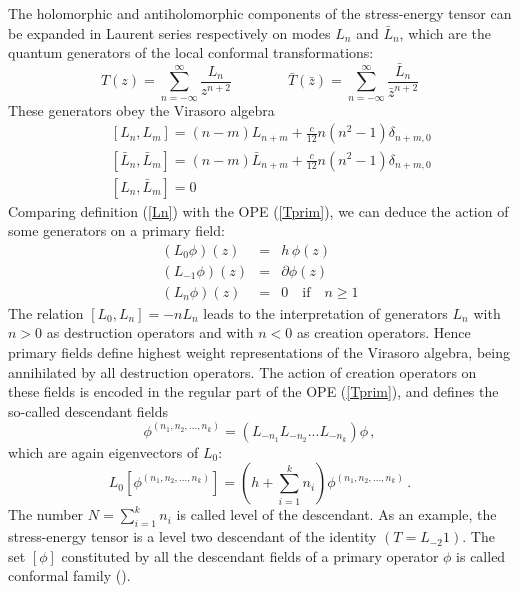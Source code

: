 \documentclass[a4paper,12pt]{report}
\begin{document}
The holomorphic and antiholomorphic components of the stress-energy tensor can be expanded in Laurent series
respectively on modes $L_{n}$ and $\bar{L}_{n}$, which are the quantum generators of the local conformal
transformations:
\begin{equation}\label{Ln}
T(z)=\sum_{n=-\infty}^{\infty}\frac{L_{n}}{z^{n+2}}\qquad\qquad
\bar{T}(\bar{z})=\sum_{n=-\infty}^{\infty}\frac{\bar{L}_{n}}{\bar{z}^{n+2}}
\end{equation}
These generators obey the Virasoro algebra
\begin{eqnarray}\label{vir}
&& [L_{n},L_{m}]=(n-m)L_{n+m}+\frac{c}{12}n(n^{2}-1)\delta_{n+m,0}\\
&& [\bar{L}_{n},\bar{L}_{m}]=(n-m)\bar{L}_{n+m}+\frac{c}{12}n(n^{2}-1)\delta_{n+m,0}\\
&& [L_{n},\bar{L}_{m}]=0
\end{eqnarray}
Comparing definition (\ref{Ln}) with the OPE (\ref{Tprim}), we can deduce the action of some generators on a
primary field:
\begin{eqnarray}\label{Lprim}
\left(L_{0}\phi\right)(z)&=&h\,\phi(z)\\
\left(L_{-1}\phi\right)(z)&=&\partial\phi(z)\\
\left(L_{n}\phi\right)(z)&=&0\quad\textrm{if}\quad n\geq 1
\end{eqnarray}
The relation $[L_{0},L_{n}]=-nL_{n}$ leads to the interpretation of generators $L_{n}$ with $n>0$ as destruction
operators and with $n<0$ as creation operators. Hence primary fields define highest weight representations of the
Virasoro algebra, being annihilated by all destruction operators. The action of creation operators on these
fields is encoded in the regular part of the OPE (\ref{Tprim}), and defines the so-called descendant fields
\begin{equation}\label{desc}
\phi^{(n_{1},n_{2},...,n_{k})}=\left(L_{-n_{1}}L_{-n_{2}}...L_{-n_{k}}\right)\phi \,,
\end{equation}
which are again eigenvectors of $L_{0}$:
\begin{equation}\label{hdesc}
L_{0}\left[\phi^{(n_{1},n_{2},...,n_{k})}\right]=\left(h+\sum_{i=1}^{k}n_{i}\right)\phi^{(n_{1},n_{2},...,n_{k})}\,.
\end{equation}
The number $N=\sum_{i=1}^{k}n_{i}$ is called level of the descendant. As an example, the stress-energy tensor is
a level two descendant of the identity $(T=L_{-2}1)$. The set $[\phi]$ constituted by all the descendant fields
of a primary operator $\phi$ is called conformal family (\cite{bpz}).
\end{document}

